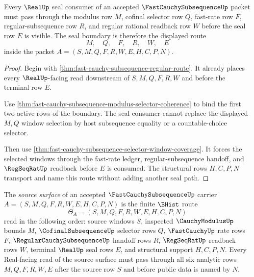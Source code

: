 \begin{theorem}
\label{thm:fast-cauchy-subsequence-real-seal-selector-boundary}
Every $\RealUp$ seal consumer of an accepted $\FastCauchySubsequenceUp$ packet must pass through the modulus row $M$, cofinal selector row $Q$, fast-rate row $F$, regular-subsequence row $R$, and regular rational readback row $W$ before the seal row $E$ is visible. The seal boundary is therefore the displayed route
$$
M,\quad Q,\quad F,\quad R,\quad W,\quad E
$$
inside the packet $A=(S,M,Q,F,R,W,E,H,C,P,N)$.
\end{theorem}
\begin{proof}
Begin with \autoref{thm:fast-cauchy-subsequence-regular-route}. It already places every $\RealUp$-facing read downstream of $S,M,Q,F,R,W$ and before the terminal row $E$.

Use \autoref{thm:fast-cauchy-subsequence-modulus-selector-coherence} to bind the first two active rows of the boundary. The seal consumer cannot replace the displayed $M,Q$ window selection by host subsequence equality or a countable-choice selector.

Then use \autoref{thm:fast-cauchy-subsequence-selector-window-coverage}. It forces the selected windows through the fast-rate ledger, regular-subsequence handoff, and $\RegSeqRatUp$ readback before $E$ is consumed. The structural rows $H,C,P,N$ transport and name this route without adding another seal path.
\end{proof}

\begin{definition}
\label{def:fast-cauchy-subsequence-source-surface}
The \emph{source surface} of an accepted $\FastCauchySubsequenceUp$ carrier $A=(S,M,Q,F,R,W,E,H,C,P,N)$ is the finite $\BHist$ route
$$
\Theta_A=(S,M,Q,F,R,W,E,H,C,P,N)
$$
read in the following order: source windows $S$, inspected $\CauchyModulusUp$ bounds $M$, $\CofinalSubsequenceUp$ selector rows $Q$, $\FastCauchyUp$ rate rows $F$, $\RegularCauchySubsequenceUp$ handoff rows $R$, $\RegSeqRatUp$ readback rows $W$, terminal $\RealUp$ seal rows $E$, and structural support $H,C,P,N$. Every Real-facing read of the source surface must pass through all six analytic rows $M,Q,F,R,W,E$ after the source row $S$ and before public data is named by $N$.
\end{definition}

